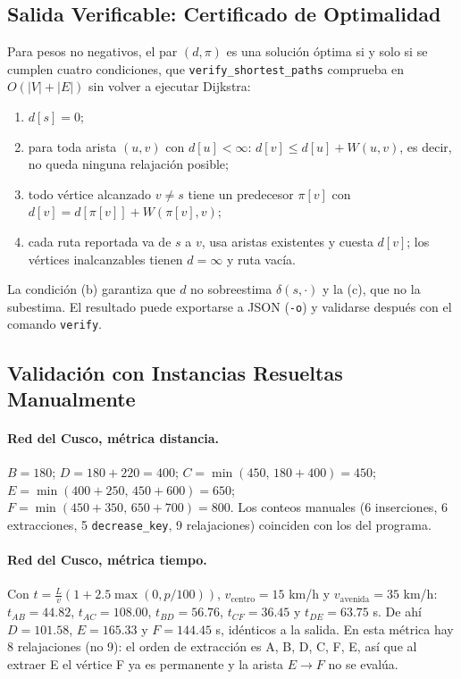 \subsection{Salida Verificable: Certificado de Optimalidad}
Para pesos no negativos, el par $(d, \pi)$ es una solución óptima si y solo si se cumplen cuatro condiciones, que \texttt{verify\_shortest\_paths} comprueba en $O(|V|+|E|)$ sin volver a ejecutar Dijkstra:
\begin{enumerate}
    \item[(a)] $d[s] = 0$;
    \item[(b)] para toda arista $(u,v)$ con $d[u] < \infty$: $d[v] \le d[u] + W(u,v)$, es decir, no queda ninguna relajación posible;
    \item[(c)] todo vértice alcanzado $v \ne s$ tiene un predecesor $\pi[v]$ con $d[v] = d[\pi[v]] + W(\pi[v], v)$;
    \item[(d)] cada ruta reportada va de $s$ a $v$, usa aristas existentes y cuesta $d[v]$; los vértices inalcanzables tienen $d = \infty$ y ruta vacía.
\end{enumerate}
La condición (b) garantiza que $d$ no sobreestima $\delta(s,\cdot)$ y la (c), que no la subestima. El resultado puede exportarse a JSON (\texttt{-o}) y validarse después con el comando \texttt{verify}.

\subsection{Validación con Instancias Resueltas Manualmente}
\paragraph{Red del Cusco, métrica distancia.} $B=180$; $D=180+220=400$; $C=\min(450,\,180+400)=450$; $E=\min(400+250,\,450+600)=650$; $F=\min(450+350,\,650+700)=800$. Los conteos manuales (6 inserciones, 6 extracciones, 5 \texttt{decrease\_key}, 9 relajaciones) coinciden con los del programa.

\paragraph{Red del Cusco, métrica tiempo.} Con $t = \frac{L}{v}\left(1 + 2.5\max(0, p/100)\right)$, $v_{\text{centro}}=15$ km/h y $v_{\text{avenida}}=35$ km/h: $t_{AB}=44.82$, $t_{AC}=108.00$, $t_{BD}=56.76$, $t_{CF}=36.45$ y $t_{DE}=63.75$ s. De ahí $D=101.58$, $E=165.33$ y $F=144.45$ s, idénticos a la salida. En esta métrica hay 8 relajaciones (no 9): el orden de extracción es A, B, D, C, F, E, así que al extraer E el vértice F ya es permanente y la arista $E\to F$ no se evalúa.


